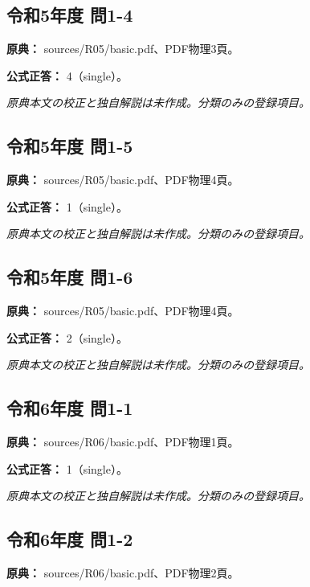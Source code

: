 \subsection{令和5年度 問1-4}
\label{q:r05-reg-basic-1-4}

\noindent\textbf{原典：} sources/R05/basic.pdf、PDF物理3頁。

\textbf{公式正答：} 4（single）。

\par\textit{原典本文の校正と独自解説は未作成。分類のみの登録項目。}

\subsection{令和5年度 問1-5}
\label{q:r05-reg-basic-1-5}

\noindent\textbf{原典：} sources/R05/basic.pdf、PDF物理4頁。

\textbf{公式正答：} 1（single）。

\par\textit{原典本文の校正と独自解説は未作成。分類のみの登録項目。}

\subsection{令和5年度 問1-6}
\label{q:r05-reg-basic-1-6}

\noindent\textbf{原典：} sources/R05/basic.pdf、PDF物理4頁。

\textbf{公式正答：} 2（single）。

\par\textit{原典本文の校正と独自解説は未作成。分類のみの登録項目。}

\subsection{令和6年度 問1-1}
\label{q:r06-reg-basic-1-1}

\noindent\textbf{原典：} sources/R06/basic.pdf、PDF物理1頁。

\textbf{公式正答：} 1（single）。

\par\textit{原典本文の校正と独自解説は未作成。分類のみの登録項目。}

\subsection{令和6年度 問1-2}
\label{q:r06-reg-basic-1-2}

\noindent\textbf{原典：} sources/R06/basic.pdf、PDF物理2頁。

